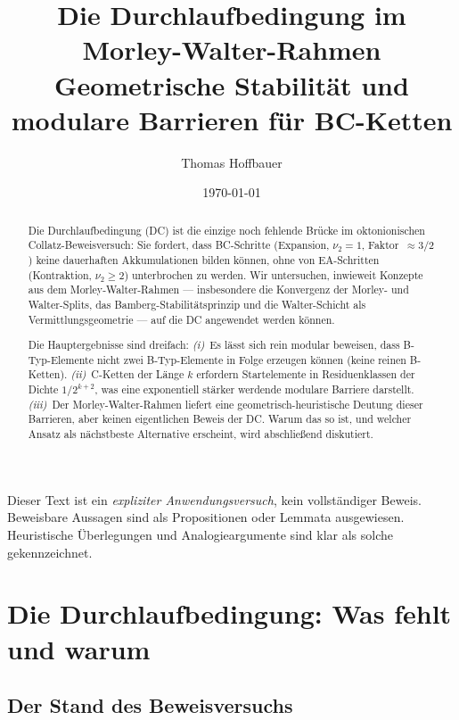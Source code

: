 \documentclass[12pt,a4paper]{article}
\title{%
  Die Durchlaufbedingung im Morley-Walter-Rahmen\\[0.3em]
  \large Geometrische Stabilität und modulare Barrieren für BC-Ketten%
}
\author{Thomas Hoffbauer}
\date{\today}
\newcommand{\vii}{\nu_2}
\begin{document}
\maketitle

\begin{abstract}
Die Durchlaufbedingung (DC) ist die einzige noch fehlende Brücke
im oktonionischen Collatz-Beweisversuch: Sie fordert, dass BC-Schritte
(Expansion, $\vii = 1$, Faktor~$\approx 3/2$) keine dauerhaften
Akkumulationen bilden können, ohne von EA-Schritten
(Kontraktion, $\vii \geq 2$) unterbrochen zu werden.
Wir untersuchen, inwieweit Konzepte aus dem Morley-Walter-Rahmen ---
insbesondere die Konvergenz der Morley- und Walter-Splits,
das Bamberg-Stabilitätsprinzip und die Walter-Schicht als Vermittlungsgeometrie ---
auf die DC angewendet werden können.

Die Hauptergebnisse sind dreifach: \emph{(i)}~Es lässt sich rein modular
beweisen, dass B-Typ-Elemente nicht zwei B-Typ-Elemente in Folge erzeugen können
(keine reinen B-Ketten). \emph{(ii)}~C-Ketten der Länge $k$ erfordern
Startelemente in Residuenklassen der Dichte $1/2^{k+2}$, was eine
exponentiell stärker werdende modulare Barriere darstellt.
\emph{(iii)}~Der Morley-Walter-Rahmen liefert eine
geometrisch-heuristische Deutung dieser Barrieren,
aber keinen eigentlichen Beweis der DC.
Warum das so ist, und welcher Ansatz als nächstbeste Alternative erscheint,
wird abschließend diskutiert.
\end{abstract}

\tableofcontents

\bigskip
\begin{tcolorbox}[warnung, title={Zur Einordnung}]
Dieser Text ist ein \emph{expliziter Anwendungsversuch}, kein vollständiger Beweis.
Beweisbare Aussagen sind als Propositionen oder Lemmata ausgewiesen.
Heuristische Überlegungen und Analogieargumente sind klar als solche gekennzeichnet.
\end{tcolorbox}

\section{Die Durchlaufbedingung: Was fehlt und warum}

\subsection{Der Stand des Beweisversuchs}
\end{document}
